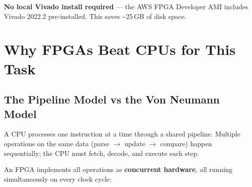 \documentclass[11pt,a4paper]{article}
\begin{document}
\noindent\textbf{No local Vivado install required} — the AWS FPGA Developer AMI includes
Vivado 2022.2 pre-installed. This saves \textasciitilde{}25\,GB of disk space.

\section{Why FPGAs Beat CPUs for This Task}

\subsection{The Pipeline Model vs the Von Neumann Model}

A CPU processes one instruction at a time through a shared pipeline.
Multiple operations on the same data (parse $\to$ update $\to$ compare) happen
sequentially; the CPU must fetch, decode, and execute each step.

An FPGA implements all operations as \textbf{concurrent hardware}, all running
simultaneously on every clock cycle:
\end{document}
